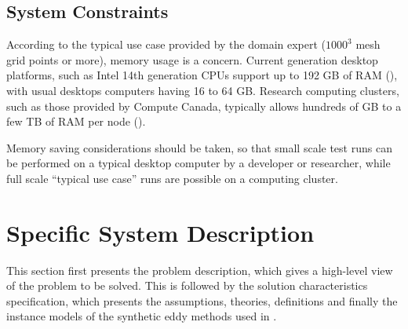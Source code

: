 \documentclass[12pt]{article}
\begin{document}

\subsection{System Constraints} \label{sec_sysConstraints}

According to the typical use case provided by the domain expert ($1000^3$ mesh grid points or more), memory usage is a concern. Current generation desktop platforms, such as Intel 14th generation CPUs support up to 192 GB of RAM (\citeyear{Intel2023}), with usual desktops computers having 16 to 64 GB. Research computing clusters, such as those provided by Compute Canada, typically allows hundreds of GB to a few TB of RAM per node (\citeyear{ComputeCanada2024}). 

Memory saving considerations should be taken, so that small scale test runs can be performed on a typical desktop computer by a developer or researcher, while full scale ``typical use case'' runs are possible on a computing cluster.


\section{Specific System Description} \label{Sec_SSD}

This section first presents the problem description, which gives a high-level
view of the problem to be solved.  This is followed by the solution characteristics
specification, which presents the assumptions, theories, definitions and finally
the instance models of the synthetic eddy methods used in \progname{}.  
\end{document}
